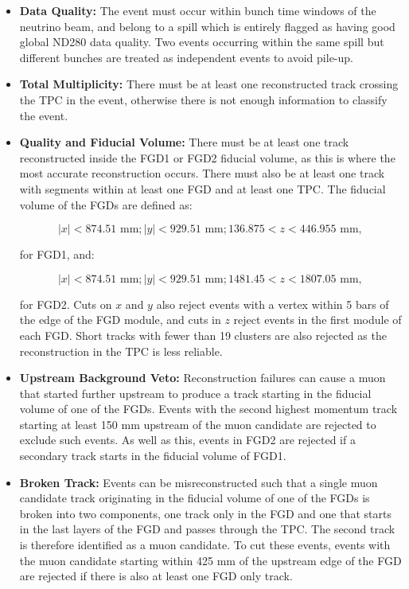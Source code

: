 \begin{itemize}

\item \textbf{Data Quality:} The event must occur within bunch time windows of the neutrino beam, and belong to a spill which is entirely flagged as having good global ND280 data quality. Two events occurring within the same spill but different bunches are treated as independent events to avoid pile-up.

\item \textbf{Total Multiplicity:} There must be at least one reconstructed track crossing the TPC in the event, otherwise there is not enough information to classify the event.

\item \textbf{Quality and Fiducial Volume:} There must be at least one track reconstructed inside the FGD1 or FGD2 fiducial volume, as this is where the most accurate reconstruction occurs. There must also be at least one track with segments within at least one FGD and at least one TPC. The fiducial volume of the FGDs are defined as:

\begin{equation}
|x| < 874.51 \textrm{ mm}; |y| < 929.51 \textrm{ mm}; 136.875 < z < 446.955 \textrm{ mm},
\end{equation}

for FGD1, and:

\begin{equation}
|x| < 874.51 \textrm{ mm}; |y| < 929.51 \textrm{ mm}; 1481.45 < z < 1807.05 \textrm{ mm},
\end{equation}

for FGD2. Cuts on $x$ and $y$ also reject events with a vertex within 5 bars of the edge of the FGD module, and cuts in $z$ reject events in the first module of each FGD. Short tracks with fewer than 19 clusters are also rejected as the reconstruction in the TPC is less reliable.

\item \textbf{Upstream Background Veto:} Reconstruction failures can cause a muon that started further upstream to produce a track starting in the fiducial volume of one of the FGDs. Events with the second highest momentum track starting at least 150 mm upstream of the muon candidate are rejected to exclude such events. As well as this, events in FGD2 are rejected if a secondary track starts in the fiducial volume of FGD1.

\item \textbf{Broken Track:} Events can be misreconstructed such that a single muon candidate track originating in the fiducial volume of one of the FGDs is broken into two components, one track only in the FGD and one that starts in the last layers of the FGD and passes through the TPC. The second track is therefore identified as a muon candidate. To cut these events, events with the muon candidate starting within 425 mm of the upstream edge of the FGD are rejected if there is also at least one FGD only track.


\end{itemize}
